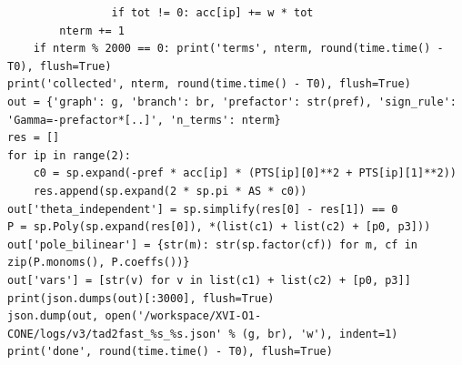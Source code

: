 \documentclass[10pt]{article}
\begin{document}
\begin{lstlisting}
                if tot != 0: acc[ip] += w * tot
        nterm += 1
    if nterm % 2000 == 0: print('terms', nterm, round(time.time() - T0), flush=True)
print('collected', nterm, round(time.time() - T0), flush=True)
out = {'graph': g, 'branch': br, 'prefactor': str(pref), 'sign_rule': 'Gamma=-prefactor*[..]', 'n_terms': nterm}
res = []
for ip in range(2):
    c0 = sp.expand(-pref * acc[ip] * (PTS[ip][0]**2 + PTS[ip][1]**2))
    res.append(sp.expand(2 * sp.pi * AS * c0))
out['theta_independent'] = sp.simplify(res[0] - res[1]) == 0
P = sp.Poly(sp.expand(res[0]), *(list(c1) + list(c2) + [p0, p3]))
out['pole_bilinear'] = {str(m): str(sp.factor(cf)) for m, cf in zip(P.monoms(), P.coeffs())}
out['vars'] = [str(v) for v in list(c1) + list(c2) + [p0, p3]]
print(json.dumps(out)[:3000], flush=True)
json.dump(out, open('/workspace/XVI-O1-CONE/logs/v3/tad2fast_%s_%s.json' % (g, br), 'w'), indent=1)
print('done', round(time.time() - T0), flush=True)
\end{lstlisting}
\end{document}
